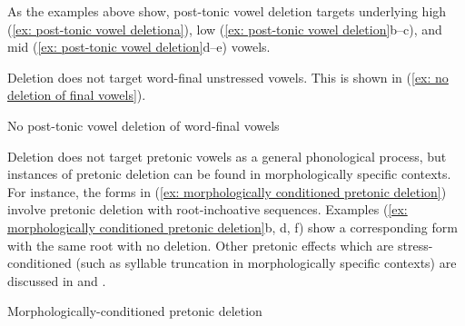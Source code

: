 As the examples above show, post-tonic vowel deletion targets underlying high (\ref{ex: post-tonic vowel deletiona}), low (\ref{ex: post-tonic vowel deletion}b--c), and mid (\ref{ex: post-tonic vowel deletion}d--e) vowels.

Deletion does not target word-final unstressed vowels. This is shown in (\ref{ex: no deletion of final vowels}).

\ea\label{ex: no deletion of final vowels}
{No post-tonic vowel deletion of word-final vowels}

    \z
\z

Deletion does not target pretonic vowels as a general phonological process, but instances of pretonic deletion can be found in morphologically specific contexts. For instance, the forms in (\ref{ex: morphologically conditioned pretonic deletion}) involve pretonic deletion with root-inchoative sequences. Examples (\ref{ex: morphologically conditioned pretonic deletion}b, d, f) show a corresponding form with the same root with no deletion. Other pretonic effects which are stress-conditioned (such as syllable truncation in morphologically specific contexts) are discussed in  and .

\ea\label{ex: morphologically conditioned pretonic deletion}
{Morphologically-conditioned pretonic deletion}


